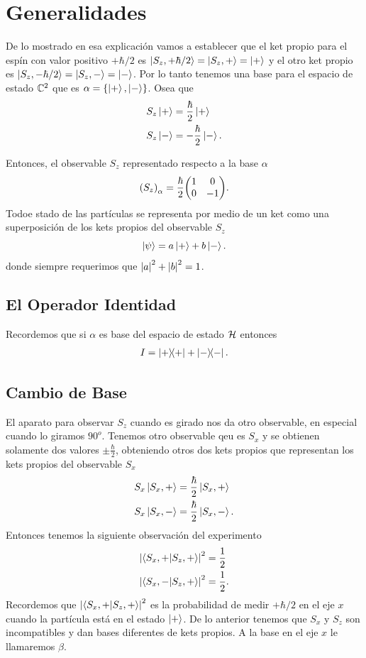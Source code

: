 \section{Generalidades}
De lo mostrado en esa explicación vamos a establecer que el ket propio para el espín con valor positivo $+\hbar /2$ es $\ket{S_z , +\hbar/2} = \ket{S_z, +} = \ket{+}$ y el otro ket propio es $\ket{S_z , -\hbar/2} = \ket{S_z, -} = \ket{-}$. Por lo tanto tenemos una base para el espacio de estado $\mathbb{C}^2$ que es $\alpha = \{ \ket{+},\ket{-} \}$. Osea que
	\begin{align}
		S_z \ket{+} &= \frac{\hbar}{2} \ket{+} \\
		S_z \ket{-} &= -\frac{\hbar}{2} \ket{-}.
	\end{align}

Entonces, el observable $S_z$ representado respecto a la base $\alpha$
	$$ \qty(S_z)_\alpha = \frac{\hbar}{2} \mqty(1 & 0 \\ 0 & -1). $$
Todoe stado de las partículas se representa por medio de un ket como una superposición de los kets propios del observable $S_z$
	$$ \ket{\psi} = a\ket{+} + b\ket{-}. $$
donde siempre requerimos que $\abs{a} ^2 + \abs{b} ^2 = 1$.

\subsection{El Operador Identidad}
Recordemos que si $\alpha$ es base del espacio de estado $\mathcal{H}$ entonces
	\begin{align}
		I = \ketbra{+} + \ketbra{-}.
	\end{align}


\subsection{Cambio de Base}
El aparato para observar $S_z$ cuando es girado nos da otro observable, en especial cuando lo giramos $90^o$. Tenemos otro observable qeu es $S_x$ y se obtienen solamente dos valores $\pm \frac{\hbar}{2}$, obteniendo otros dos kets propios que representan los kets propios del observable $S_x$
	\begin{align}
		S_x \ket{S_x,+} &= \frac{\hbar}{2} \ket{S_x, +} \\
		S_x \ket{S_x,-} &= \frac{\hbar}{2} \ket{S_x, -}.
	\end{align}
Entonces tenemos la siguiente observación del experimento
	\begin{align*}
		\abs{\braket{S_x,+}{S_z,+}}^2 &= \frac{1}{2} \\
		\abs{\braket{S_x,-}{S_z,+}}^2 &= \frac{1}{2}.
	\end{align*}
Recordemos que $\abs{\braket{S_x,+}{S_z,+}}^2$ es la probabilidad de medir $+\hbar /2$ en el eje $x$ cuando la partícula está en el estado $\ket{+}$. De lo anterior tenemos que $S_x$ y $S_z$ son incompatibles y dan bases diferentes de kets propios. A la base en el eje $x$ le llamaremos $\beta$.

